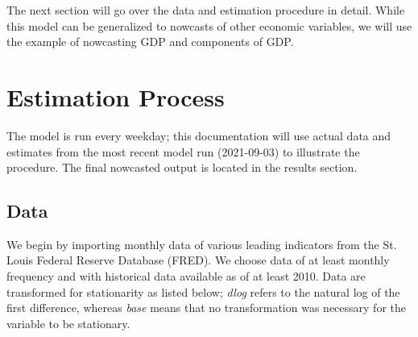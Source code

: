 \documentclass[11pt, letterpaper]{article}\usepackage[]{graphicx}\usepackage[]{color}
\begin{document}
The next section will go over the data and estimation procedure in detail. While this model can be generalized to nowcasts of other economic variables, we will use the example of nowcasting GDP and components of GDP.

\newpage
\section{Estimation Process}
The model is run every weekday; this documentation will use actual data and estimates from the most recent model run (2021-09-03) to illustrate the procedure. The final nowcasted output is located in the results section.

\subsection{Data}
We begin by importing monthly data of various leading indicators from the St. Louis Federal Reserve Database (FRED). We choose data of at least monthly frequency and with historical data available as of at least 2010. Data are transformed for stationarity as listed below; \textit{dlog} refers to the natural log of the first difference, whereas \textit{base} means that no transformation was necessary for the variable to be stationary.
\end{document}
